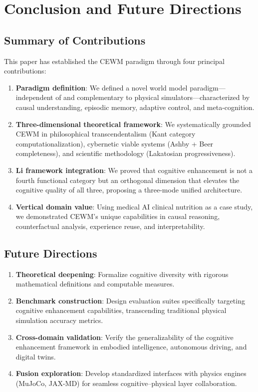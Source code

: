 \documentclass[11pt,a4paper]{article}
\newcommand{\CEWM}{\textsc{CEWM}}
\begin{document}
\section{Conclusion and Future Directions}\label{sec:conclusion}

\subsection{Summary of Contributions}

This paper has established the \CEWM{} paradigm through four principal contributions:
\begin{enumerate}
  \item \textbf{Paradigm definition}: We defined a novel world model paradigm---independent of and complementary to physical simulators---characterized by causal understanding, episodic memory, adaptive control, and meta-cognition.
  \item \textbf{Three-dimensional theoretical framework}: We systematically grounded \CEWM{} in philosophical transcendentalism (Kant category computationalization), cybernetic viable systems (Ashby + Beer completeness), and scientific methodology (Lakatosian progressiveness).
  \item \textbf{Li framework integration}: We proved that cognitive enhancement is not a fourth functional category but an orthogonal dimension that elevates the cognitive quality of all three, proposing a three-mode unified architecture.
  \item \textbf{Vertical domain value}: Using medical AI clinical nutrition as a case study, we demonstrated \CEWM{}'s unique capabilities in causal reasoning, counterfactual analysis, experience reuse, and interpretability.
\end{enumerate}

\subsection{Future Directions}

\begin{enumerate}[nosep]
  \item \textbf{Theoretical deepening}: Formalize cognitive diversity with rigorous mathematical definitions and computable measures.
  \item \textbf{Benchmark construction}: Design evaluation suites specifically targeting cognitive enhancement capabilities, transcending traditional physical simulation accuracy metrics.
  \item \textbf{Cross-domain validation}: Verify the generalizability of the cognitive enhancement framework in embodied intelligence, autonomous driving, and digital twins.
  \item \textbf{Fusion exploration}: Develop standardized interfaces with physics engines (MuJoCo, JAX-MD) for seamless cognitive--physical layer collaboration.
\end{enumerate}
\end{document}
